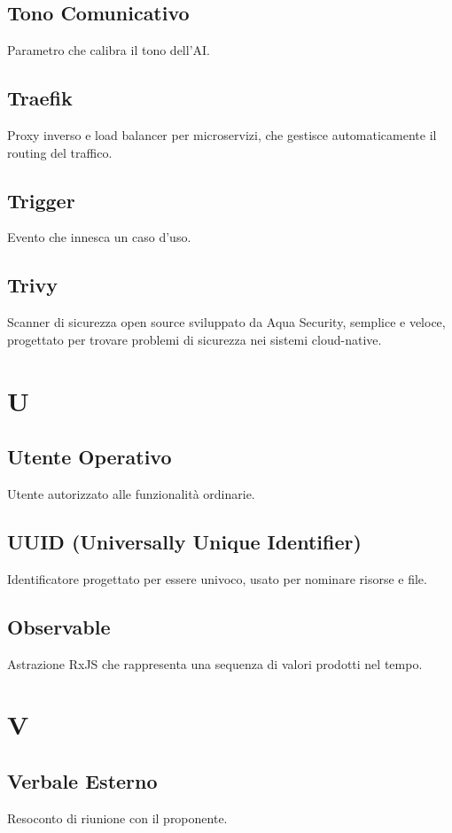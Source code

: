 \documentclass[a4paper,12pt]{article}
\begin{document}
\subsection{Tono Comunicativo}
Parametro che calibra il tono dell'AI.

\subsection{Traefik}
Proxy inverso e load balancer per microservizi, che gestisce automaticamente il routing del traffico.

\subsection{Trigger}
Evento che innesca un caso d'uso.

\subsection{Trivy}
Scanner di sicurezza open source sviluppato da Aqua Security, semplice e veloce, progettato per trovare problemi di sicurezza nei sistemi cloud-native.

\section{U}
\subsection{Utente Operativo}
Utente autorizzato alle funzionalità ordinarie.

\subsection{UUID (Universally Unique Identifier)}
Identificatore progettato per essere univoco, usato per nominare risorse e file.

\subsection{Observable}
Astrazione RxJS che rappresenta una sequenza di valori prodotti nel tempo.

\section{V}
\subsection{Verbale Esterno}
Resoconto di riunione con il proponente.
\end{document}
